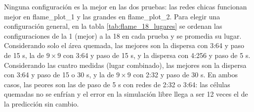	
	Ninguna configuración es la mejor en las dos pruebas: las redes chicas funcionan mejor en flame\_plot\_1 y las grandes en flame\_plot\_2. Para elegir una configuración general, en la tabla \ref{tab:flame_18_lugares} se ordenan las configuraciones de la 1 (mejor) a la 18 en cada prueba y se promedia su lugar. Considerando solo el área quemada, las mejores son la dispersa con 3:64 y paso de 15 s, la de $9 \times 9$ con 3:64 y paso de 15 s, y la dispersa con 4:256 y paso de 5 s. Considerando las cuatro medidas (lugar combinado), las mejores son la dispersa con 3:64 y paso de 15 o 30 s, y la de $9 \times 9$ con 2:32 y paso de 30 s. En ambos casos, las peores son las de paso de 5 s con redes de 2:32 o 3:64: las células quemadas no se enfrían y el error en la simulación libre llega a ser 12 veces el de la predicción sin cambio.

